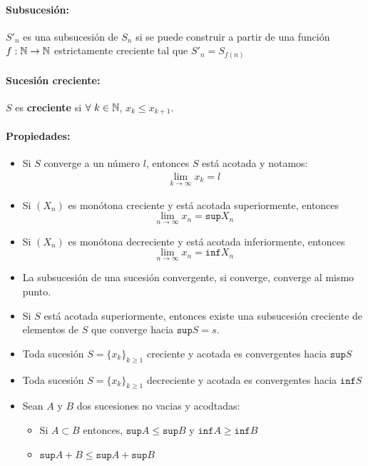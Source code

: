 \paragraph{Subsucesión: } $S'_n$ es una subsucesión de $S_n$ si se puede construir a partir de una función $f : \mathbb{N}\rightarrow \mathbb{N}$ estrictamente creciente tal que $S'_n = S_{f(n)}$

\paragraph{Sucesión creciente:} $S$ es \textbf{creciente} si $\forall~k\in\mathbb{N}$, $x_k\leq x_{k+1}$.

\paragraph{Propiedades:}
\begin{itemize}
\item Si $S$ converge a un número $l$, entonces $S$ está acotada y notamos: 
\begin{align*}
\lim_{k\to\infty} x_k = l
\end{align*}

\item Si $(X_n)$ es monótona creciente y está acotada superiormente, entonces $$\lim_{n\rightarrow\infty} x_n = \texttt{sup}{X_n}$$
\item Si $(X_n)$ es monótona decreciente y está acotada inferiormente, entonces $$\lim_{n\rightarrow\infty} x_n = \texttt{inf}{X_n}$$
\item La subsucesión de una sucesión convergente, si converge, converge al mismo punto.
\item Si $S$ está acotada superiormente, entonces existe una subsucesión creciente de elementos de $S$ que converge hacia $\texttt{sup}{S} = s$.
\item Toda sucesión $S = \{x_k\}_{k\geq1}$ creciente y acotada es convergentes hacia $\texttt{sup}{S}$
\item Toda sucesión $S = \{x_k\}_{k\geq1}$ decreciente y acotada es convergentes hacia $\texttt{inf}{S}$
\item Sean $A$ y $B$ dos sucesiones no vacias y acodtadas:
\begin{itemize}
\item Si $A\subset B$ entonces, $\texttt{sup}{A}\leq\texttt{sup}{B}$ y $\texttt{inf}{A}\geq\texttt{inf}{B}$
\item $\texttt{sup}{A+B} \leq \texttt{sup}{A}+ \texttt{sup}{B}$
\end{itemize} 
\end{itemize}

